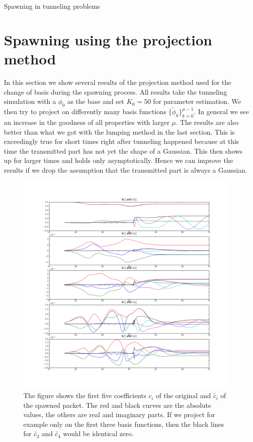 \begin{chapter}{Spawning in tunneling problems}
 
\FloatBarrier
\section{Spawning using the projection method}

In this section we show several results of the projection method used for the change
of basis during the spawning process. All results take the tunneling simulation with
a $\phi_0$ as the base and set $K_0 = 50$ for parameter estimation. We then try to
project on differently many basis functions $\{\tilde{\phi}_k\}_{k=0}^{\mu-1}$. In
general we see an increase in the goodness of all properties with larger $\mu$. The
results are also better than what we got with the lumping method in the last section.
This is exceedingly true for short times right after tunneling happened because
at this time the transmitted part has not yet the shape of a Gaussian. This then
shows up for larger times and holds only asymptotically. Hence we can improve the results
if we drop the assumption that the transmitted part is always a Gaussian.


\begin{figure}[h!]
  \centering
  \includegraphics[width=\the\linewidth]{./figures/eckart_phi0_spawn_project_K50_bs6/wavepacket_coefficients_spawn_first.png}
  \caption[The first five coefficients $c_i$ of the original and $\tilde{c_i}$ of the spawned packet]
  {The figure shows the first five coefficients $c_i$ of the original and $\tilde{c_i}$ of the spawned packet.
  The red and black curves are the absolute values, the others are real and imaginary parts. If we project for example
  only on the first three basis functions, then the black lines for $\tilde{c_3}$ and $\tilde{c_4}$ would be
  identical zero.}
\end{figure}



\end{chapter}
